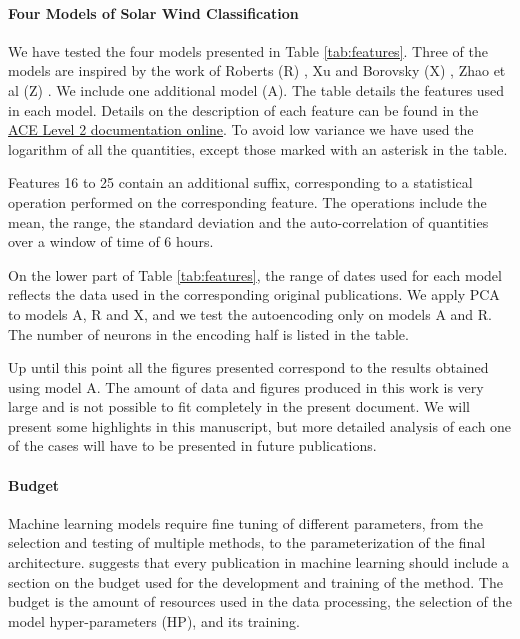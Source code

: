 \paragraph{Four Models of Solar Wind Classification}
We have tested the four models presented in Table \ref{tab:features}. Three of the models are inspired by the work of Roberts (R) \citep{Roberts2020}, Xu and Borovsky (X) \citep{[XU??]}, Zhao et al (Z) \citep{Zhao2009}. We include one additional model (A). The table details the features used in each model. Details on the description of each feature can be found in the \href{http://www.srl.caltech.edu/cgi-bin/dib/rundibviewmultil2/ACE/ASC/DATA/level2/multi}{ACE Level 2 documentation online}. To avoid low variance we have used the logarithm of all the quantities, except those marked with an asterisk in the table.

Features 16 to 25 contain an additional suffix, corresponding to a statistical operation performed on the corresponding feature. The operations include the mean, the range, the standard deviation and the auto-correlation of quantities over a window of time of 6 hours.

On the lower part of Table \ref{tab:features}, the range of dates used for each model reflects the data used in the corresponding original publications. We apply PCA to models A, R and X, and we test the autoencoding only on models A and R. The number of neurons in the encoding half is listed in the table.

Up until this point all the figures presented correspond to the results obtained using model A. The amount of data and figures produced in this work is very large and is not possible to fit completely in the present document. We will present some highlights in this manuscript, but more detailed analysis of each one of the cases will have to be presented in future publications.

\paragraph{Budget}
Machine learning models require fine tuning of different parameters, from the selection and testing of multiple methods, to the parameterization of the final architecture. \citep{[REF??]} suggests that every publication in machine learning should include a section on the budget used for the development and training of the method. The budget is the amount of resources used in the data processing, the selection of the model hyper-parameters (HP), and its training.

